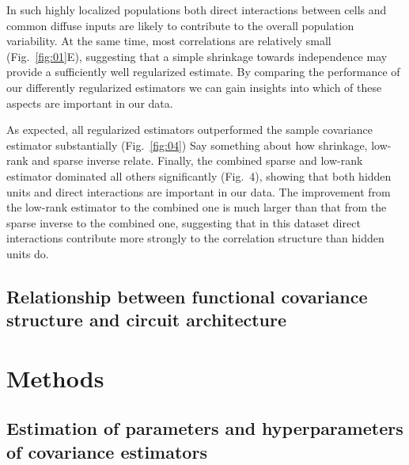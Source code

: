 \documentclass[10pt]{article}
\begin{document}
In such highly localized populations both direct interactions between cells and common diffuse inputs are likely to contribute to the overall population variability. At the same time, most correlations are relatively small (Fig.~\ref{fig:01}E), suggesting that a simple shrinkage towards independence may provide a sufficiently well regularized estimate. By comparing the performance of our differently regularized estimators we can gain insights into which of these aspects are important in our data.

As expected, all regularized estimators outperformed the sample covariance estimator substantially (Fig.~\ref{fig:04}) Say something about how shrinkage, low-rank and sparse inverse relate. Finally, the combined sparse and low-rank estimator dominated all others significantly (Fig.~4), showing that both hidden units and direct interactions are important in our data. The improvement from the low-rank estimator to the combined one is much larger than that from the sparse inverse to the combined one, suggesting that in this dataset direct interactions contribute more strongly to the correlation structure than hidden units do.



\subsection*{Relationship between functional covariance structure and circuit architecture}

\section*{Methods}
\subsection*{Estimation of parameters and hyperparameters of covariance estimators}
 
\end{document}
